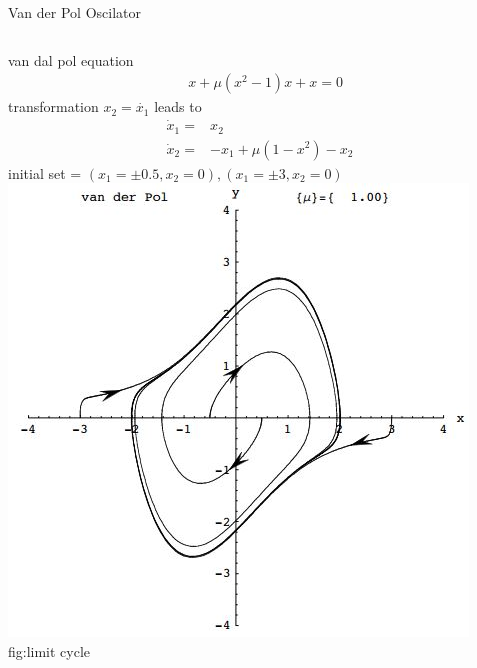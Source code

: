 \documentclass{beamer}
\begin{document}
\begin{frame}{Van der Pol Oscilator}
    \begin{columns}[T]
    van dal pol equation
    \begin{align*}
    & x+\mu(x^2-1)x+x=0
    \end{align*}
    transformation $x_2=\dot{x_1}$ leads to
    \begin{align*}
        \dot{x}_1 =& x_2\\
        \dot{x}_2 =& -x_1+\mu(1-x^2)-x_2
    \end{align*}
    initial set = ${(x_1=\pm0.5,x_2=0),(x_1=\pm3,x_2=0)}$
    \vspace{1cm}
        \vspace{-1cm}
        \includegraphics[width=\textwidth]{fig/van.jpg} 
        \newline fig:limit cycle  
    \end{columns}
\end{frame}
\end{document}
